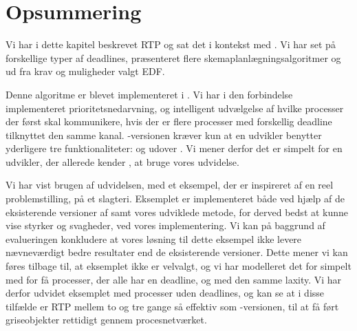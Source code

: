 \section{Opsummering}
Vi har i dette kapitel beskrevet RTP og sat det i kontekst med \pycsp. Vi har set på forskellige typer af deadlines, præsenteret flere skemaplanlægningsalgoritmer og ud fra krav og muligheder valgt EDF. 

Denne algoritme er blevet implementeret i \pycsp. Vi har i den forbindelse implementeret prioritetsnedarvning, og intelligent udvælgelse af hvilke processer der først skal kommunikere, hvis der er flere processer med forskellig deadline tilknyttet den samme kanal. -versionen kræver kun at en udvikler benytter yderligere tre funktionaliteter:  og  udover \pycsp. Vi mener derfor det er simpelt for en udvikler, der allerede kender \pycsp, at bruge vores udvidelse.

Vi har vist brugen af udvidelsen, med et eksempel,  der er inspireret af en reel problemstilling, på et slagteri. Eksemplet er implementeret både ved hjælp af de eksisterende versioner af \pycsp  samt vores udviklede metode, for derved bedst at kunne vise styrker og svagheder, ved vores implementering. Vi kan på baggrund af evalueringen konkludere at vores løsning til dette eksempel ikke levere nævneværdigt bedre resultater end de eksisterende versioner. 
Dette mener vi kan føres tilbage til, at eksemplet ikke er velvalgt, og vi har modelleret det for simpelt med for få processer, der alle har en deadline, og med den samme laxity. Vi har derfor udvidet eksemplet med processer uden deadlines, og kan se at i disse tilfælde er RTP mellem to og tre gange så effektiv som -versionen, til at få ført griseobjekter rettidigt gennem procesnetværket.  






